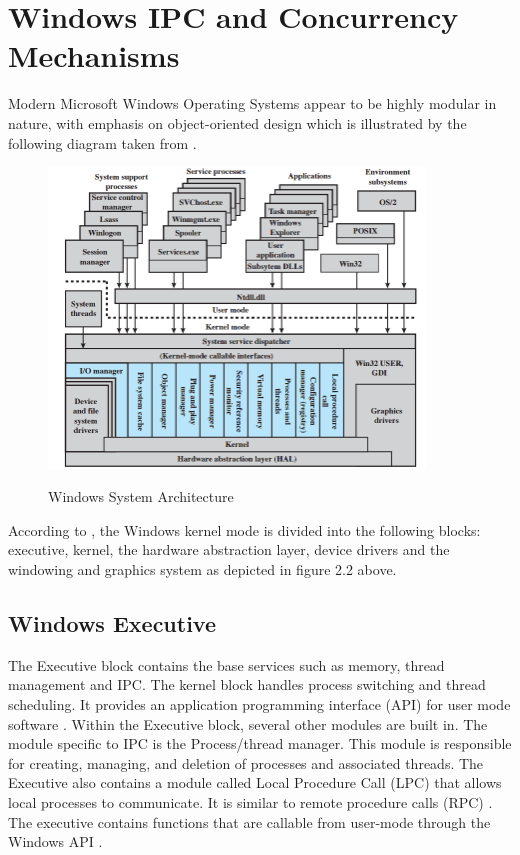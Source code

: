 \documentclass[12pt] {newrucsthesis}    %
\begin{document}
    \section{Windows IPC and Concurrency Mechanisms}
      Modern Microsoft Windows Operating Systems appear to be highly modular in nature,
      with emphasis on object-oriented design which is illustrated by the following diagram taken from \cite{WinInt2009}.
      \begin{figure}[H]
      \includegraphics[width=10cm]{winArch}
      \label{fig:winArch}
      \caption{Windows System Architecture}
      \end{figure}
      According to \cite{OSInternals&DesignPrinciplesStallings}, the Windows kernel mode is
      divided into the following blocks: executive, kernel, the hardware abstraction layer,
      device drivers and the windowing and graphics system as depicted in figure 2.2 above.

      \subsection{Windows Executive}
        The Executive block contains the base services such as memory, thread management and IPC. The kernel block handles
        process switching and thread scheduling.
        It provides an application programming interface (API) for user mode software \citep{OSInternals&DesignPrinciplesStallings}.
        Within the Executive block, several other modules are built in. The module specific to IPC is the Process/thread manager.
        This module is responsible for creating, managing, and deletion of processes and associated threads.
        The Executive also contains a module called Local Procedure Call (LPC) that allows local processes to communicate.
        It is similar to remote procedure calls (RPC) \citep{OSInternals&DesignPrinciplesStallings}.
        The executive contains functions that are callable
        from user-mode through the Windows API \citep{WinInternalsPart12012}.
\end{document}
